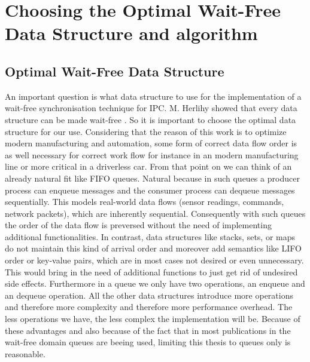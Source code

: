 \chapter{Choosing the Optimal Wait-Free Data Structure and algorithm}\label{ch:choosing-the-optimal-wait-free-data-structure}

\section{Optimal Wait-Free Data Structure}\label{sec:optimal-wait-free-data-structure}

An important question is what data structure to use for the implementation of a wait-free synchronisation technique for \ac{IPC}. M. Herlihy showed that every data structure can be made wait-free \cite{herlihy1991wait}. So it is important to choose the optimal data structure for our use. Considering that the reason of this work is to optimize modern manufacturing and automation, some form of correct data flow order is as well necessary for correct work flow for instance in an modern manufacturing line or more critical in a driverless car. From that point on we can think of an already natural fit like \ac{FIFO} queues. Natural because in such queues a producer process can enqueue messages and the consumer process can dequeue messages sequentially. This models real-world data flows (sensor readings, commands, network packets), which are inherently sequential. Consequently with such queues the order of the data flow is preversed without the need of implementing additional functionalities. In contrast, data structures like stacks, sets, or maps do not maintain this kind of arrival order and moreover add semantics like \ac{LIFO} order or key-value pairs, which are in most cases not desired or even unnecessary. This would bring in the need of additional functions to just get rid of undesired side effects. Furthermore in a queue we only have two operations, an enqueue and an dequeue operation. All the other data structures introduce more operations and therefore more complexity and therefore more performance overhead. The less operations we have, the less complex the implementation will be. Because of these advantages and also because of the fact that in most publications in the wait-free domain queues are beeing used, limiting this thesis to queues only is reasonable. \cite{jiffy}

